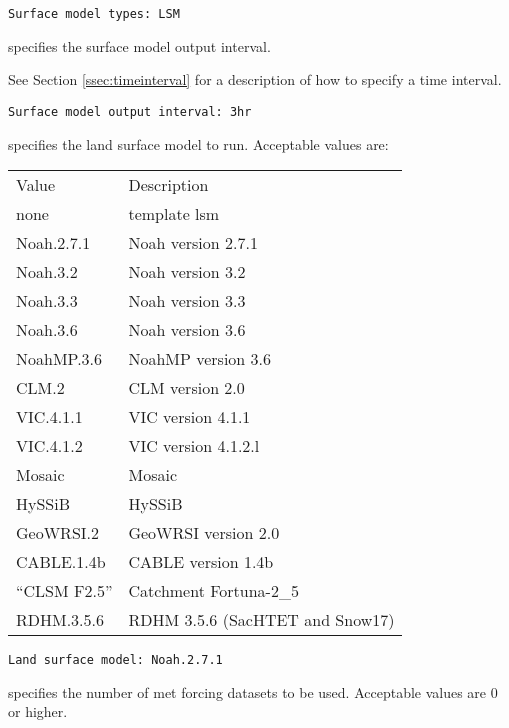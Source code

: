  \begin{Verbatim}[frame=single]
Surface model types: LSM
 \end{Verbatim}

 
  specifies the surface model
 output interval.

 See Section \ref{ssec:timeinterval} for a description
 of how to specify a time interval.
 

 \begin{Verbatim}[frame=single]
Surface model output interval: 3hr
 \end{Verbatim}

 
  specifies the land surface model to run.
 Acceptable values are:

 \begin{tabular}{ll}
 Value       & Description           \\
 none        & template lsm          \\
 Noah.2.7.1  & Noah version 2.7.1    \\
 Noah.3.2    & Noah version 3.2      \\
 Noah.3.3    & Noah version 3.3      \\
 Noah.3.6    & Noah version 3.6      \\
 NoahMP.3.6  & NoahMP version 3.6    \\
 CLM.2       & CLM version 2.0       \\
 VIC.4.1.1   & VIC version 4.1.1     \\
 VIC.4.1.2   & VIC version 4.1.2.l   \\
 Mosaic      & Mosaic                \\
 HySSiB      & HySSiB                \\
 GeoWRSI.2   & GeoWRSI version 2.0   \\
 CABLE.1.4b  & CABLE version 1.4b    \\
 ``CLSM F2.5''  & Catchment Fortuna-2\_5 \\
 RDHM.3.5.6  & RDHM 3.5.6 (SacHTET and Snow17) \\
 \end{tabular}
 

 \begin{Verbatim}[frame=single]
Land surface model: Noah.2.7.1
 \end{Verbatim}




 
  specifies the
 number of met forcing datasets to be used. Acceptable 
 values are 0 or higher. 
 

